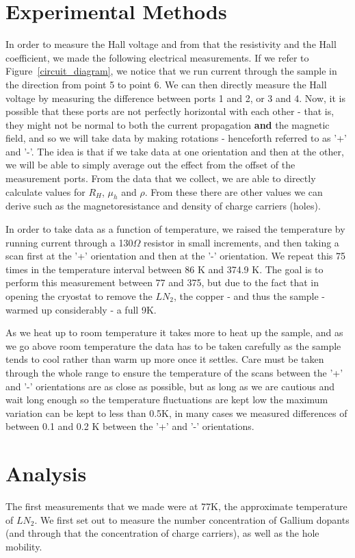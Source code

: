 \documentclass[reprint, nobibnotes, amssymb, amsmath, amsfonts, physics, mathtools, mathrsfs, floatfix]{revtex4-1}
\begin{document}
    \section{Experimental Methods}
    In order to measure the Hall voltage and from that the resistivity and the Hall coefficient, we made the following electrical measurements.  If we refer to Figure~\ref{circuit_diagram}, we notice that we run current through the sample in the direction from point 5 to point 6.  We can then directly measure the Hall voltage by measuring the difference between ports 1 and 2, or 3 and 4.  Now, it is possible that these ports are not perfectly horizontal with each other - that is, they might not be normal to both the current propagation \textbf{and} the magnetic field, and so we will take data by making rotations - henceforth referred to as '+' and '-'.  The idea is that if we take data at one orientation and then at the other, we will be able to simply average out the effect from the offset of the measurement ports.  From the data that we collect, we are able to directly calculate values for $R_H$, $\mu_h$ and $\rho$.  From these there are other values we can derive such as the magnetoresistance and density of charge carriers (holes).

    In order to take data as a function of temperature, we raised the temperature by running current through a 130$\Omega$ resistor in small increments, and then taking a scan first at the '+' orientation and then at the '-' orientation.  We repeat this 75 times in the temperature interval between 86 K and 374.9 K.  The goal is to perform this measurement between 77 and 375, but due to the fact that in opening the cryostat to remove the $LN_2$, the copper - and thus the sample - warmed up considerably - a full 9K.

    As we heat up to room temperature it takes more to heat up the sample, and as we go above room temperature the data has to be taken carefully as the sample tends to cool rather than warm up more once it settles.  Care must be taken through the whole range to ensure the temperature of the scans between the '+' and '-' orientations are as close as possible, but as long as we are cautious and wait long enough so the temperature fluctuations are kept low the maximum variation can be kept to less than 0.5K, in many cases we measured differences of between 0.1 and 0.2 K between the '+' and '-' orientations.

    \section{Analysis}
    The first measurements that we made were at 77K, the approximate temperature of $LN_2$.  We first set out to measure the number concentration of Gallium dopants (and through that the concentration of charge carriers), as well as the hole mobility.
\end{document}
